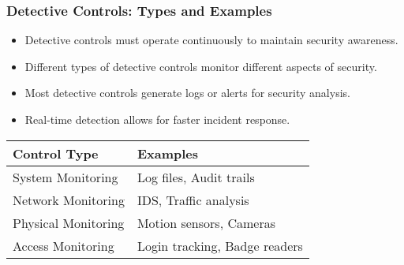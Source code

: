 \documentclass{beamer}
\begin{document}
\begin{frame}
    \frametitle{Detective Controls: Types and Examples}
    
    \begin{itemize}
        \item Detective controls must operate continuously to maintain security awareness.
        
        \item Different types of detective controls monitor different aspects of security.
        
        \item Most detective controls generate logs or alerts for security analysis.
        
        \item Real-time detection allows for faster incident response.
    \end{itemize}
    
    \begin{table}
        \begin{tabular}{|l|l|}
            \hline
            \textbf{Control Type} & \textbf{Examples} \\
            \hline
            System Monitoring & Log files, Audit trails \\
            Network Monitoring & IDS, Traffic analysis \\
            Physical Monitoring & Motion sensors, Cameras \\
            Access Monitoring & Login tracking, Badge readers \\
            \hline
        \end{tabular}
    \end{table}
\end{frame}
\end{document}

